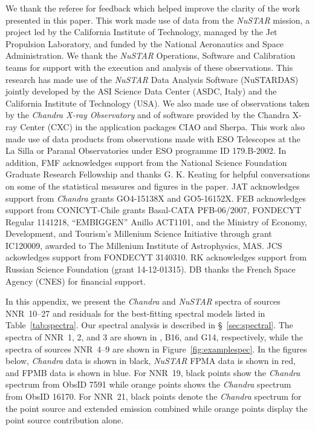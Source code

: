 \documentclass[iop,revtex4]{emulateapj}
\begin{document}
\acknowledgments

We thank the referee for feedback which helped improve the clarity of the work presented in this paper.  This work made use of data from the \textit{NuSTAR} mission, a project led by the California Institute of Technology, managed by the Jet Propulsion Laboratory, and funded by the National Aeronautics and Space Administration.  We thank the \textit{NuSTAR} Operations, Software and Calibration teams for support with the execution and analysis of these observations. This research has made use of the \textit{NuSTAR} Data Analysis Software (NuSTARDAS) jointly developed by the ASI Science Data Center (ASDC, Italy) and the California Institute of Technology (USA).  We also made use of observations taken by the \textit{Chandra X-ray Observatory} and of software provided by the Chandra X-ray Center (CXC) in the application packages CIAO and Sherpa.  This work also made use of data products from observations made with ESO Telescopes at the La Silla or Paranal Observatories under ESO programme ID 179.B-2002.  In addition, FMF acknowledges support from the National Science Foundation Graduate Research Fellowship and thanks G. K. Keating for helpful conversations on some of the statistical measures and figures in the paper.  JAT acknowledges support from \textit{Chandra} grants GO4-15138X and GO5-16152X.  FEB acknowledges support from CONICYT-Chile grants Basal-CATA PFB-06/2007, FONDECYT Regular 1141218, ``EMBIGGEN'' Anillo ACT1101, and the Ministry of Economy, Development, and Tourism's Millenium Science Initiative through grant IC120009, awarded to The Millenium Institute of Astrophysics, MAS.  JCS ackowledges support from FONDECYT 3140310.  RK acknowledges support from Russian Science Foundation (grant 14-12-01315).  DB thanks the French Space Agency (CNES) for financial support.  




\appendix
In this appendix, we present the \textit{Chandra} and \textit{NuSTAR} spectra of sources NNR~10--27 and residuals for the best-fitting spectral models listed in Table~\ref{tab:spectra}.  Our spectral analysis is described in \S~\ref{sec:spectral}.  The spectra of NNR~1, 2, and 3 are shown in \citealt{king14}, B16, and G14, respectively, while the spectra of sources NNR~4--9 are shown in Figure~\ref{fig:examplespec}.  In the figures below, \textit{Chandra} data is shown in black, \textit{NuSTAR} FPMA data is shown in red, and FPMB data is shown in blue.  For NNR~19, black points show the \textit{Chandra} spectrum from ObsID 7591 while orange points shows the \textit{Chandra} spectrum from ObsID 16170.  For NNR~21, black points denote the \textit{Chandra} spectrum for the point source and extended emission combined while orange points display the point source contribution alone.
\end{document}
